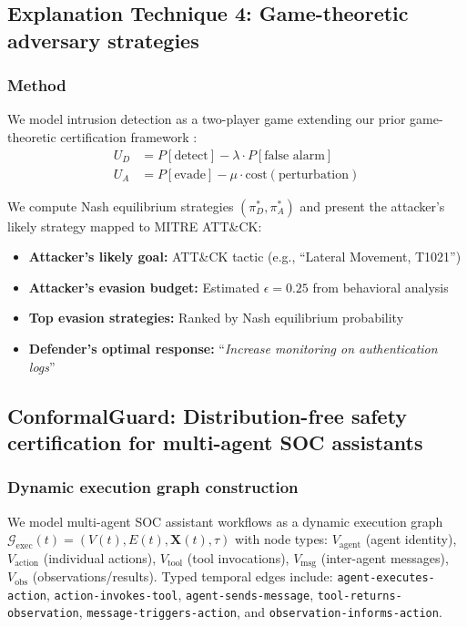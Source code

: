 \documentclass[preprint,review,12pt]{elsarticle}
\newcommand{\calG}{\mathcal{G}}
\begin{document}
\subsection{Explanation Technique 4: Game-theoretic adversary strategies}

\subsubsection{Method}
We model intrusion detection as a two-player game extending our prior game-theoretic certification framework \cite{anaedevha_game_theory}:
\begin{align}
    U_D &= P[\text{detect}] - \lambda \cdot P[\text{false alarm}] \label{eq:defender_utility} \\
    U_A &= P[\text{evade}] - \mu \cdot \text{cost}(\text{perturbation}) \label{eq:attacker_utility}
\end{align}

We compute Nash equilibrium strategies $(\pi_D^*, \pi_A^*)$ and present the attacker's likely strategy mapped to MITRE ATT\&CK:
\begin{itemize}
    \item \textbf{Attacker's likely goal:} ATT\&CK tactic (e.g., ``Lateral Movement, T1021'')
    \item \textbf{Attacker's evasion budget:} Estimated $\epsilon = 0.25$ from behavioral analysis
    \item \textbf{Top evasion strategies:} Ranked by Nash equilibrium probability
    \item \textbf{Defender's optimal response:} ``\textit{Increase monitoring on authentication logs}''
\end{itemize}

\subsection{ConformalGuard: Distribution-free safety certification for multi-agent SOC assistants}
\label{sec:conformalguard}

\subsubsection{Dynamic execution graph construction}
We model multi-agent SOC assistant workflows as a dynamic execution graph $\calG_{\text{exec}}(t) = (V(t), E(t), \mathbf{X}(t), \tau)$ with node types: $V_{\text{agent}}$ (agent identity), $V_{\text{action}}$ (individual actions), $V_{\text{tool}}$ (tool invocations), $V_{\text{msg}}$ (inter-agent messages), $V_{\text{obs}}$ (observations/results). Typed temporal edges include: \texttt{agent-executes-action}, \texttt{action-invokes-tool}, \texttt{agent-sends-message}, \texttt{tool-returns-observation}, \texttt{message-triggers-action}, and \texttt{observation-informs-action}.
\end{document}
